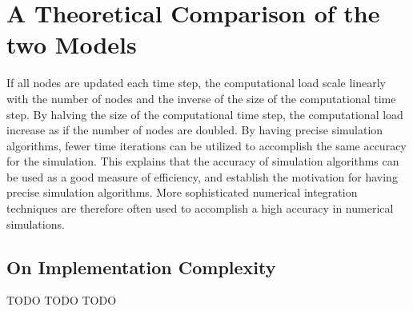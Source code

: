 
\section{A Theoretical Comparison of the two Models}
\label{secComparisonOfTheTwoModels}




		If all nodes are updated each time step, the computational load scale linearly with the number of nodes and the inverse of the size of the computational time step.
		By halving the size of the computational time step, the computational load increase as if the number of nodes are doubled.
		By having precise simulation algorithms, fewer time iterations can be utilized to accomplish the same accuracy for the simulation.
		This explains that the accuracy of simulation algorithms can be used as a good measure of efficiency, and establish the motivation for having precise simulation algorithms.
		More sophisticated numerical integration techniques are therefore often used to accomplish a high accuracy in numerical simulations\cite{PlesserStraubeMorrisonPlesser2007}.



 	\subsection{On Implementation Complexity} TODO TODO
	TODO %

